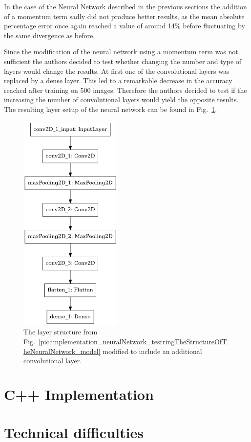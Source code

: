 In the case of the Neural Network described in the previous sections the addition of a momentum term sadly did not produce better results, as the mean absolute percentage error once again reached a value of around 14\% before fluctuating by the same divergence as before.

Since the modification of the neural network using a momentum term was not sufficient the authors decided to test whether changing the number and type of layers would change the results. At first one of the convolutional layers was replaced by a dense layer. This led to a remarkable decrease in the accuracy reached after training on 500 images. Therefore the authors decided to test if the increasing the number of convolutional layers would yield the opposite results. The resulting layer setup of the neural network can be found in Fig.~\ref{pic:implementation_neuralNetwork_modificationsToTheNN_model}.

\begin{figure}[h!]
	\centering
	\includegraphics[width=2in]{img/implementation_neuralNetwork_modificationsToTheNN_model.png}
	\caption{The layer structure from Fig.~\ref{pic:implementation_neuralNetwork_testringTheStructureOfTheNeuralNetwork_model} modified to include an additional convolutional layer.}
	\label{pic:implementation_neuralNetwork_modificationsToTheNN_model}
\end{figure}

\section{C++ Implementation}

\section{Technical difficulties}

\filbreak
